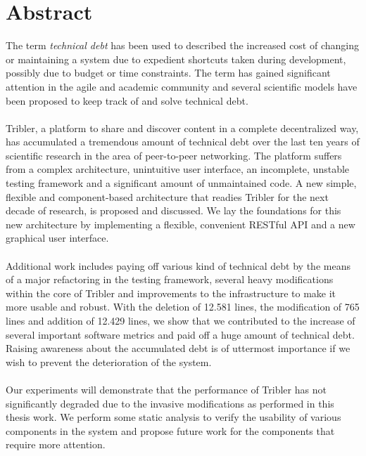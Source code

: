 \chapter*{Abstract}
The term \emph{technical debt} has been used to described the increased cost of changing or maintaining a system due to expedient shortcuts taken during development, possibly due to budget or time constraints. The term has gained significant attention in the agile and academic community and several scientific models have been proposed to keep track of and solve technical debt.\\\\
Tribler, a platform to share and discover content in a complete decentralized way, has accumulated a tremendous amount of technical debt over the last ten years of scientific research in the area of peer-to-peer networking.
The platform suffers from a complex architecture, unintuitive user interface, an incomplete, unstable testing framework and a significant amount of unmaintained code.
A new simple, flexible and component-based architecture that readies Tribler for the next decade of research, is proposed and discussed.
We lay the foundations for this new architecture by implementing a flexible, convenient RESTful API and a new graphical user interface.\\\\
Additional work includes paying off various kind of technical debt by the means of a major refactoring in the testing framework, several heavy modifications within the core of Tribler and improvements to the infrastructure to make it more usable and robust.
With the deletion of 12.581 lines, the modification of 765 lines and addition of 12.429 lines, we show that we contributed to the increase of several important software metrics and paid off a huge amount of technical debt. Raising awareness about the accumulated debt is of uttermost importance if we wish to prevent the deterioration of the system.\\\\
Our experiments will demonstrate that the performance of Tribler has not significantly degraded due to the invasive modifications as performed in this thesis work. We perform some static analysis to verify the usability of various components in the system and propose future work for the components that require more attention.